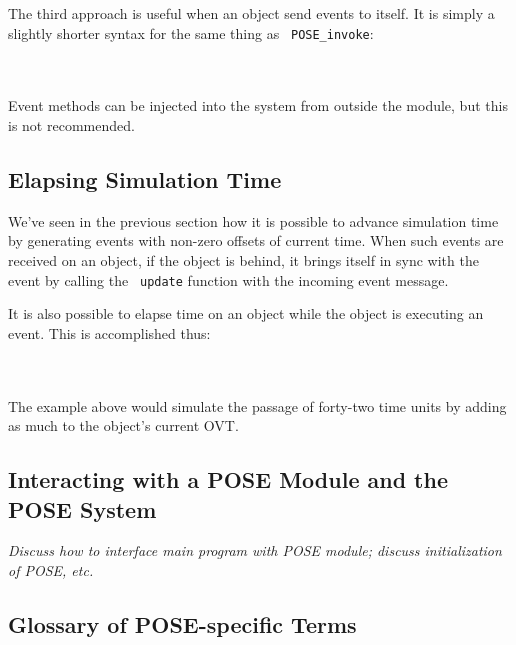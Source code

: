 \documentclass[10pt]{article}
\begin{document}
The third approach is useful when an object send events to itself.  It
is simply a slightly shorter syntax for the same thing as {\tt
POSE\_invoke}: 

~\\
\\

Event methods can be injected into the system from outside the module,
but this is not recommended.  

\subsection{Elapsing Simulation Time}

We've seen in the previous section how it is possible to advance
simulation time by generating events with non-zero offsets of current
time.  When such events are received on an object, if the object is
behind, it brings itself in sync with the event by calling the {\tt
update} function with the incoming event message.  

It is also possible to elapse time on an object while the object is
executing an event.  This is accomplished thus:

~\\
\\

The example above would simulate the passage of forty-two time units
by adding as much to the object's current OVT.

\subsection{Interacting with a POSE Module and the POSE System}

{\it Discuss how to interface main program with POSE module; discuss
initialization of POSE, etc.}

\subsection{Glossary of POSE-specific Terms}
\end{document}

